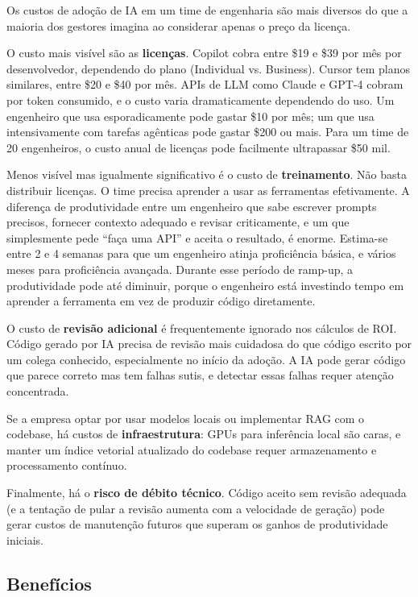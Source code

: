 Os custos de adoção de IA em um time de engenharia são mais diversos do que a
maioria dos gestores imagina ao considerar apenas o preço da licença.

O custo mais visível são as \textbf{licenças}. Copilot cobra entre \$19 e \$39 por mês
por desenvolvedor, dependendo do plano (Individual vs. Business). Cursor tem planos
similares, entre \$20 e \$40 por mês. APIs de LLM como Claude e GPT-4 cobram por
token consumido, e o custo varia dramaticamente dependendo do uso. Um engenheiro
que usa esporadicamente pode gastar \$10 por mês; um que usa intensivamente com
tarefas agênticas pode gastar \$200 ou mais. Para um time de 20 engenheiros, o custo
anual de licenças pode facilmente ultrapassar \$50 mil.

Menos visível mas igualmente significativo é o custo de \textbf{treinamento}. Não basta
distribuir licenças. O time precisa aprender a usar as ferramentas efetivamente.
A diferença de produtividade entre um engenheiro que sabe escrever prompts precisos,
fornecer contexto adequado e revisar criticamente, e um que simplesmente pede ``faça
uma API'' e aceita o resultado, é enorme. Estima-se entre 2 e 4 semanas para que um
engenheiro atinja proficiência básica, e vários meses para proficiência avançada.
Durante esse período de ramp-up, a produtividade pode até diminuir, porque o engenheiro
está investindo tempo em aprender a ferramenta em vez de produzir código diretamente.

O custo de \textbf{revisão adicional} é frequentemente ignorado nos cálculos de ROI.
Código gerado por IA precisa de revisão mais cuidadosa do que código escrito por um
colega conhecido, especialmente no início da adoção. A IA pode gerar código que parece
correto mas tem falhas sutis, e detectar essas falhas requer atenção concentrada.

Se a empresa optar por usar modelos locais ou implementar RAG com o codebase, há custos
de \textbf{infraestrutura}: GPUs para inferência local são caras, e manter um índice
vetorial atualizado do codebase requer armazenamento e processamento contínuo.

Finalmente, há o \textbf{risco de débito técnico}. Código aceito sem revisão adequada
(e a tentação de pular a revisão aumenta com a velocidade de geração) pode gerar custos
de manutenção futuros que superam os ganhos de produtividade iniciais.

\subsection{Benefícios}

